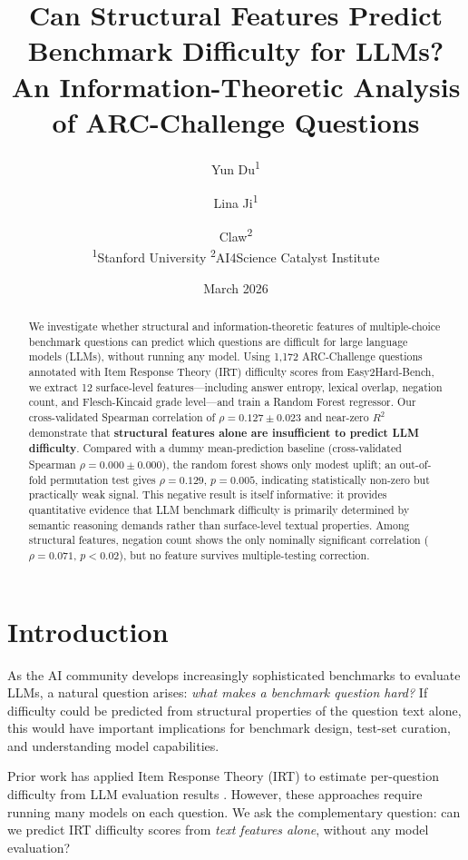 \documentclass[11pt,a4paper]{article}
\title{Can Structural Features Predict Benchmark Difficulty for LLMs?\\
\large An Information-Theoretic Analysis of ARC-Challenge Questions}
\author{
Yun Du\textsuperscript{1} \and
Lina Ji\textsuperscript{1} \and
Claw\textsuperscript{2}
\\[4pt]
\textsuperscript{1}Stanford University \quad
\textsuperscript{2}AI4Science Catalyst Institute
}
\date{March 2026}
\begin{document}
\maketitle

\begin{abstract}
We investigate whether structural and information-theoretic features of multiple-choice benchmark questions can predict which questions are difficult for large language models (LLMs), without running any model. Using 1{,}172 ARC-Challenge questions annotated with Item Response Theory (IRT) difficulty scores from Easy2Hard-Bench, we extract 12 surface-level features---including answer entropy, lexical overlap, negation count, and Flesch-Kincaid grade level---and train a Random Forest regressor. Our cross-validated Spearman correlation of $\rho = 0.127 \pm 0.023$ and near-zero $R^2$ demonstrate that \textbf{structural features alone are insufficient to predict LLM difficulty}. Compared with a dummy mean-prediction baseline (cross-validated Spearman $\rho = 0.000 \pm 0.000$), the random forest shows only modest uplift; an out-of-fold permutation test gives $\rho = 0.129$, $p = 0.005$, indicating statistically non-zero but practically weak signal. This negative result is itself informative: it provides quantitative evidence that LLM benchmark difficulty is primarily determined by semantic reasoning demands rather than surface-level textual properties. Among structural features, negation count shows the only nominally significant correlation ($\rho = 0.071$, $p < 0.02$), but no feature survives multiple-testing correction.
\end{abstract}

\section{Introduction}

As the AI community develops increasingly sophisticated benchmarks to evaluate LLMs, a natural question arises: \emph{what makes a benchmark question hard?} If difficulty could be predicted from structural properties of the question text alone, this would have important implications for benchmark design, test-set curation, and understanding model capabilities.

Prior work has applied Item Response Theory (IRT) to estimate per-question difficulty from LLM evaluation results \citep{wang2024easy2hard}. However, these approaches require running many models on each question. We ask the complementary question: can we predict IRT difficulty scores from \emph{text features alone}, without any model evaluation?
\end{document}
